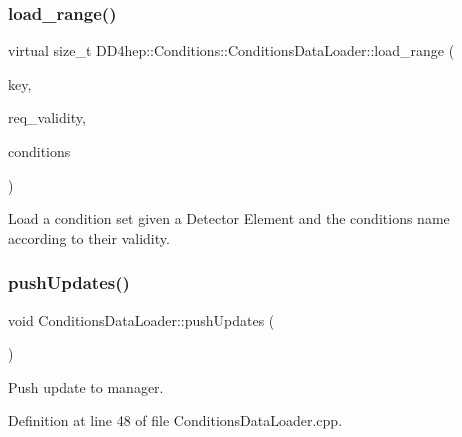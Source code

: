 \subsubsection{\texorpdfstring{load\+\_\+range()}{load\_range()}}
{\footnotesize\ttfamily virtual size\+\_\+t D\+D4hep\+::\+Conditions\+::\+Conditions\+Data\+Loader\+::load\+\_\+range (\begin{DoxyParamCaption}\item[{\hyperlink{class_d_d4hep_1_1_conditions_1_1_conditions_data_loader_ac17b71656c9d6b5365c62d1d606ba8cc}{key\+\_\+type}}]{key,  }\item[{const \hyperlink{class_d_d4hep_1_1_conditions_1_1_conditions_data_loader_a510aa9a02f5e798d8d96c9e3cb5a36af}{iov\+\_\+type} \&}]{req\+\_\+validity,  }\item[{\hyperlink{namespace_d_d4hep_1_1_conditions_ae765f0140a33973a430280f02b6062f4}{Range\+Conditions} \&}]{conditions }\end{DoxyParamCaption})\hspace{0.3cm}{\ttfamily [pure virtual]}}



Load a condition set given a Detector Element and the conditions name according to their validity. 

\hypertarget{class_d_d4hep_1_1_conditions_1_1_conditions_data_loader_a65ad637b1fa714f1d3b784fdfcdccd37}{}\label{class_d_d4hep_1_1_conditions_1_1_conditions_data_loader_a65ad637b1fa714f1d3b784fdfcdccd37} 
\subsubsection{\texorpdfstring{push\+Updates()}{pushUpdates()}}
{\footnotesize\ttfamily void Conditions\+Data\+Loader\+::push\+Updates (\begin{DoxyParamCaption}{ }\end{DoxyParamCaption})\hspace{0.3cm}{\ttfamily [protected]}}



Push update to manager. 



Definition at line 48 of file Conditions\+Data\+Loader.\+cpp.



